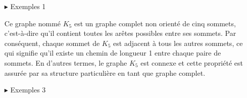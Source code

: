 \documentclass[hidelinks,letterpaper,12pt]{article}
\newcounter{Exemple} %
\begin{document}
\begin{itemize}
\item[$\blacktriangleright$] Exemples 1
\\		
\begin{figure}[H]
	\centering	
	\newcommand\size{2}%
	\label{Exemple 1 d'un graphe connexe}	
\end{figure}

Ce graphe nommé $K_5$ est un graphe complet non orienté de cinq sommets, c'est-à-dire qu'il contient toutes les arêtes possibles entre ses sommets. Par conséquent, chaque sommet de $K_5$ est adjacent à tous les autres sommets, ce qui signifie qu'il existe un chemin de longueur 1 entre chaque paire de sommets. En d'autres termes, le graphe $K_5$ est connexe et cette propriété est assurée par sa structure particulière en tant que graphe complet.
\\
\item[$\blacktriangleright$] Exemples 3
\\ \\
\begin{figure}[H]
	\centering	
\end{figure}
\end{itemize}
\end{document}
